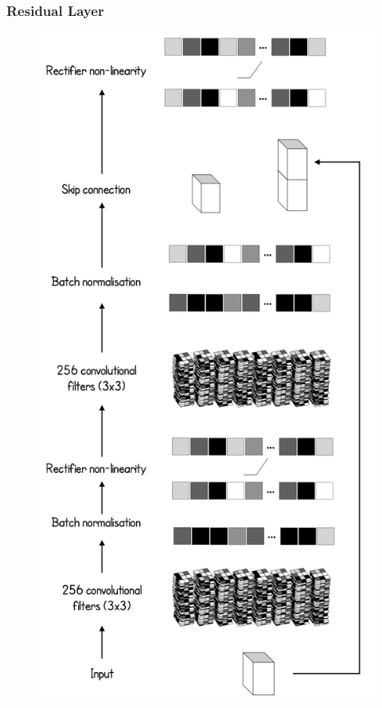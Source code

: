 \documentclass[notheorems, aspectratio=54]{beamer}
\begin{document}
\begin{frame}
    \frametitle{Residual Layer}

    \begin{figure}
        \includegraphics[height=0.9\textheight]{fig/residual_layer.png}
    \end{figure}
\end{frame}
\end{document}
